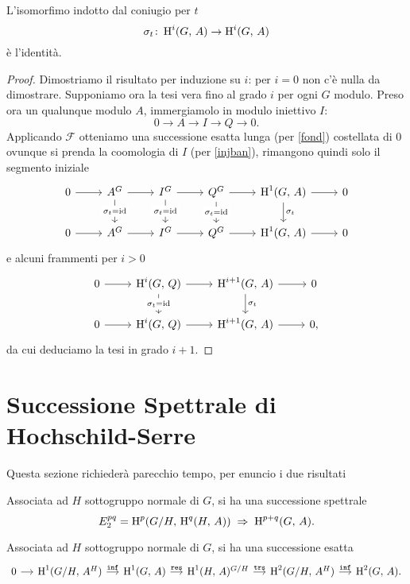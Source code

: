\begin{proposition}
	L'isomorfimo indotto dal coniugio per $ t $
	\[ \sigma_t \colon \operatorname{H}^i(G, \, A) \to \operatorname{H}^i(G, \, A) \]
	è l'identità.
\end{proposition}
\begin{proof}
	Dimostriamo il risultato per induzione su $ i $: per $ i = 0 $ non c'è nulla da dimostrare. Supponiamo ora la tesi vera fino al grado $ i $ per ogni $ G $ modulo. Preso ora un qualunque modulo $ A $, immergiamolo in modulo iniettivo $ I $:
	\[ 0 \to A \to I \to Q \to 0. \]
	Applicando $ \mathcal{F} $ otteniamo una successione esatta lunga (per \ref{fond}) costellata di $ 0 $ ovunque si prenda la coomologia di $ I $ (per \ref{injban}), rimangono quindi solo il segmento iniziale
	\[\begin{tikzcd}
	0 \rar & A^G \rar\dar["\sigma_t = \id" description] & I^G \rar\dar["\sigma_t = \id" description] & Q^G \rar\dar["\sigma_t = \id" description] & \HH^1(G, \, A) \rar\dar["\sigma_t"] & 0 \\
	0 \rar & A^G \rar & I^G \rar & Q^G \rar & \HH^1(G, \, A) \rar & 0
	\end{tikzcd}\]
	e alcuni frammenti per $ i > 0 $
	\[\begin{tikzcd}
	0 \rar & \HH^i(G, \, Q) \rar\dar["\sigma_t = \id" description] & \HH^{i+1}(G, \, A) \rar\dar["\sigma_t"] & 0 \\
	0 \rar & \HH^i(G, \, Q) \rar & \HH^{i+1}(G, \, A) \rar & 0,
	\end{tikzcd}\]
	da cui deduciamo la tesi in grado $ i+1 $.
\end{proof}
\newpage
\section{Successione Spettrale di Hochschild-Serre}

Questa sezione richiederà parecchio tempo, per enuncio i due risultati

\begin{theorem}
	Associata ad $ H $ sottogruppo normale di $ G $, si ha una successione spettrale
	\[ E^{pq}_2 = \operatorname{H}^p(G/H, \, \operatorname{H}^q(H, \, A)) \;\Rightarrow\; \operatorname{H}^{p+q}(G, \, A). \]
	
\end{theorem}

\begin{corollary}
	Associata ad $ H $ sottogruppo normale di $ G $, si ha una successione esatta
	\[\begin{tikzcd}[column sep = small]
	0 \rar & \HH^1(G/H, \, A^H) \rar["\Inf"]
	& \HH^1(G, \, A) \rar["\Res"]
	& \HH^1(H, \, A)^{G/H} \rar["\texttt{trs}"]
	& \HH^2(G/H, \, A^H) \rar["\Inf"]
	& \HH^2(G, \, A).
	\end{tikzcd} \]
\end{corollary}

